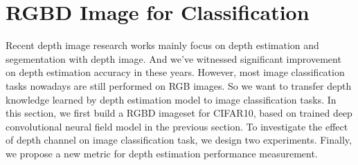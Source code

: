 \documentclass[10pt,twocolumn,letterpaper]{article}
\begin{document}
\section{RGBD Image for Classification}
Recent depth image research works
mainly focus on depth estimation\cite{liu2015deep} 
and segementation with depth image\cite{eigen2015predicting}.
And we\rq{}ve witnessed significant improvement on depth estimation accuracy in these years. 
However, most image classification tasks nowadays are still performed on RGB images.
So we want to transfer depth knowledge learned by depth estimation model to image classification tasks.
In this section, 
we first build a RGBD imageset for CIFAR10\cite{krizhevsky2009learning}, 
based on trained deep convolutional neural field model in the previous section. 
To investigate the effect of depth channel on image classification task, 
we design two experiments. 
Finally, we propose a new metric for depth estimation performance measurement.
\end{document}
